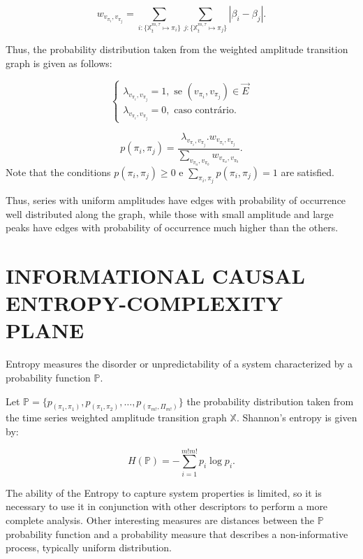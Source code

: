 \documentclass{isprs}
\begin{document}
	\begin{equation}
	w_{v_{\pi_i}, v_{\pi_j}} =  \sum_{i : \{\mathbb{X}^{m,\tau}_t \mapsto \pi_i\}} \sum_{j : \{\mathbb{X}^{m,\tau}_t \mapsto \pi_j\}} |\beta_i - \beta_j| .
	\end{equation}
	
	Thus, the probability distribution taken from the weighted amplitude transition graph is given as follows:	
	
	\begin{equation}
	\left\{\begin{array}{l}
	\lambda_{v_{\pi_i}, v_{\pi_j}} = 1, \text{ se } (v_{\pi_i}, v_{\pi_j}) \in \vec{E} \\
	\lambda_{v_{\pi_i}, v_{\pi_j}} = 0, \text{ caso contrário}.
	\end{array}\right.
	\end{equation}
	
	\begin{equation}
	p(\pi_i, \pi_j) = \frac{\lambda_{v_{\pi_i}, v_{\pi_j}} . w_{v_{\pi_i}, v_{\pi_j}}}{\sum_{v_{\pi_a}, v_{\pi_b}} w_{v_{\pi_a}, v_{\pi_b}}}.
	\end{equation}	
	Note that the conditions $p(\pi_i, \pi_j) \ge 0$ e $\sum_{\pi_i, \pi_j} p(\pi_i, \pi_j) = 1$ are satisfied.
	
	Thus, series with uniform amplitudes have edges with probability of occurrence well distributed along the graph, while those with small amplitude and large peaks have edges with probability of occurrence much higher than the others.
	
	\section{INFORMATIONAL CAUSAL ENTROPY-COMPLEXITY PLANE}\label{HC}
	
	Entropy measures the disorder or unpredictability of a system characterized by a probability function $\mathbb{P}$.
	
	Let $\mathbb{P} = \{p_{(\pi_1, \pi_1)}, p_{(\pi_1, \pi_2)}, \dots, p_{(\pi_{m!}, \Pi_{m!})} \}$  the probability distribution taken from the time series weighted amplitude transition graph $\mathbb{X}$.
	Shannon's entropy is given by:	
	
	\begin{equation}
	H(\mathbb{P}) = -\sum_{i=1}^{m!m!} p_i \log p_i .
	\label{eq:Entropia}
	\end{equation}
	
	The ability of the Entropy to capture system properties is limited, so it is necessary to use it in conjunction with other descriptors to perform a more complete analysis.
	Other interesting measures are distances between the $\mathbb{P}$ probability function and a probability measure that describes a non-informative process, typically uniform distribution.
	
\end{document}
